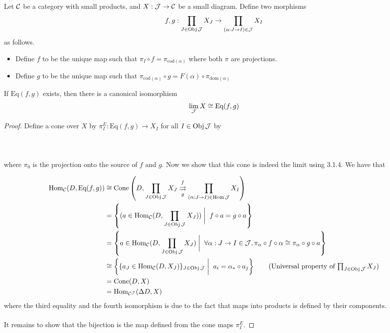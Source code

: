 \documentclass[a4paper]{article}
\begin{document}
\begin{thm}{}{} Let $\mathcal{C}$ be a category with small products, and $X:\mathcal{J}\to\mathcal{C}$ be a small diagram. Define two morphisms $$f,g:\prod_{J\in\operatorname{Obj}\mathcal{J}}X_J\to\prod_{(\alpha:J\to I)\in\mathcal{J}}X_I$$ as follows. 
\begin{itemize}
\item Define $f$ to be the unique map such that $\pi_I\circ f=\pi_{\text{cod}(\alpha)}$ where both $\pi$ are projections. 
\item Define $g$ to be the unique map such that $\pi_{\text{cod}(\alpha)}\circ g=F(\alpha)\circ\pi_{\text{dom}(\alpha)}$
\end{itemize}
If $\text{Eq}(f,g)$ exists, then there is a canonical isomorphism $$\lim_{\mathcal{J}} X\cong\text{Eq}(f,g)$$ \tcbline
\begin{proof}
Define a cone over $X$ by $\pi_I^E:\text{Eq}(f,g)\to X_I$ for all $I\in\operatorname{Obj}\mathcal{J}$ by \\~\\
 \\~\\
where $\pi_0$ is the projection onto the source of $f$ and $g$. Now we show that this cone is indeed the limit using 3.1.4. We have that 

\begin{align*}
\Hom_\mC(D,\text{Eq}(f,g))&\cong\text{Cone}\left(D,\prod_{J\in\Obj\mJ}X_J\overset{f}{\underset{g}{\rightrightarrows}}\prod_{(\alpha:J\to I)\in\Hom\mJ}X_I\right)\\
&=\left\{(a\in\Hom_\mC(D,\prod_{J\in\Obj\mJ}X_J))\;\bigg{|}\;\; f\circ a=g\circ a\right\}\\
&=\left\{a\in\Hom_\mC(D,\prod_{J\in\Obj\mJ}X_J)\;\bigg{|}\;\;\forall\alpha:J\to I\in\mJ, \pi_\alpha\circ f\circ\alpha\cong\pi_\alpha\circ g\circ a\right\}\\
&\cong\left\{\{a_J\in\Hom_\mC(D,X_J)\}_{J\in\Obj\mJ}\;\bigg{|}\;\; a_i=\alpha_\ast\circ a_j\right\}\tag{Universal property of $\prod_{J\in\Obj\mJ}X_J$}\\
&=\text{Cone}(D,X)\\
&=\Hom_{\mC^\mJ}(\Delta D,X)
\end{align*}
where the third equality and the fourth isomorphism is due to the fact that maps into products is defined by their components. \\~\\

It remains to show that the bijection is the map defined from the cone maps $\pi_I^E$. 
\end{proof}
\end{thm}
\end{document}
